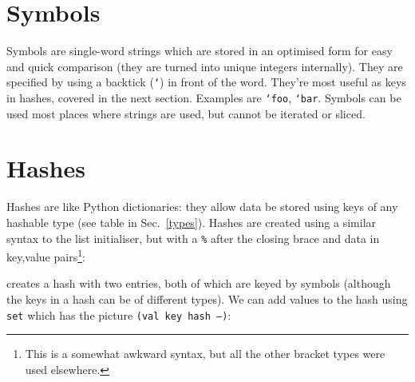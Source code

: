 \section{Symbols}
Symbols are single-word strings which are stored in an optimised form for easy
and quick comparison (they are turned into unique integers
internally). They are specified by using a backtick (\texttt{`}) in front of
the word. They're most useful as keys in hashes, covered in the next section.
Examples are \texttt{`foo}, \texttt{`bar}. Symbols can be used
most places where strings are used, but cannot be iterated or sliced.

\section{Hashes}
\label{hashes}
Hashes are like Python dictionaries: they allow data be stored using keys of any hashable type (see table in Sec.~\ref{types}).
Hashes are created
using a similar syntax to the list initialiser, but with a \texttt{\%} after
the closing brace and data in key,value pairs\footnote{This is a somewhat
awkward syntax, but all the other bracket types were used elsewhere.}:
\indw{[\%]}
\end{v}
creates a hash with two entries, both of which are keyed by symbols (although
the keys in a hash can be of different types). We can add values to the hash
using \texttt{set} which has the picture \texttt{(val key hash --)}:

